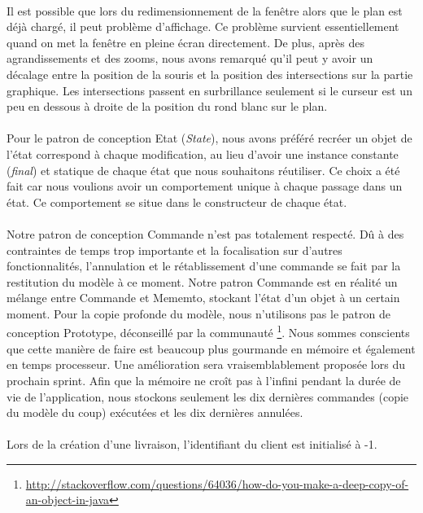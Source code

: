 \documentclass[10pt,a4paper]{book}
\begin{document}
\paragraph{}
Il est possible que lors du redimensionnement de la fenêtre alors que le plan est déjà chargé, il peut problème d'affichage. Ce problème survient essentiellement quand on met la fenêtre en pleine écran directement. De plus, après des agrandissements et des zooms, nous avons remarqué qu'il peut y avoir un décalage entre la position de la souris et la position des intersections sur la partie graphique. Les intersections passent en surbrillance seulement si le curseur est un peu en dessous à droite de la position du rond blanc sur le plan.
\paragraph{}
Pour le patron de conception Etat (\textit{State}), nous avons préféré recréer un objet de l'état correspond à chaque modification, au lieu d'avoir une instance constante (\textit{final}) et statique de chaque état que nous souhaitons réutiliser. Ce choix a été fait car nous voulions avoir un comportement unique à chaque passage dans un état. Ce comportement se situe dans le constructeur de chaque état.
\paragraph{}
Notre patron de conception Commande n'est pas totalement respecté. Dû à des contraintes de temps trop importante et la focalisation sur d'autres fonctionnalités, l'annulation et le rétablissement d'une commande se fait par la restitution du modèle à ce moment. Notre patron Commande est en réalité un mélange entre Commande et Mememto, stockant l'état d'un objet à un certain moment. Pour la copie profonde du modèle, nous n'utilisons pas le patron de conception Prototype, déconseillé par la communauté \footnote{\url{http://stackoverflow.com/questions/64036/how-do-you-make-a-deep-copy-of-an-object-in-java}}. Nous sommes conscients que cette manière de faire est beaucoup plus gourmande en mémoire et également en temps processeur. Une amélioration sera vraisemblablement proposée lors du prochain sprint. Afin que la mémoire ne croît pas à l'infini pendant la durée de vie de l'application, nous stockons seulement les dix dernières commandes (copie du modèle du coup) exécutées et les dix dernières annulées.
\paragraph{}
Lors de la création d'une livraison, l'identifiant du client est initialisé à -1.
\end{document}
